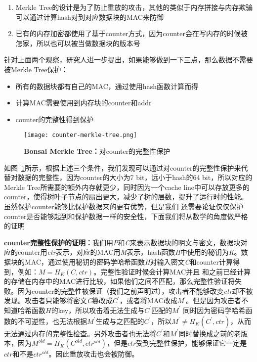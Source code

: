 \begin{enumerate}
    \item Merkle Tree的设计是为了防止重放的攻击，其他的类似于内存拼接与内存欺骗可以通过计算hash对到对应数据块的MAC来防御
    \item 已有的内存加密都使用了基于counter方式，因为counter会在写内存的时候被怎家，所以也可以被当做数据块的版本号
\end{enumerate}
针对上面两个观察，研究人进一步提出，如果能够做到一下三点，那么数据不需要被Merkle Tree保护：
\begin{itemize}
    \item 所有的数据块都有自己的MAC，通过使用hash函数计算而得
    \item 计算MAC需要使用到内存块的counter和addr
    \item counter的完整性得到保护
\end{itemize}
\begin{figure}[!htp]
    \centering
    \texttt{[image: counter-merkle-tree.png]}
    \caption{\textbf{Bonsai Merkle Tree：}对counter的完整性保护 }
   \label{fig:counter-merkle-tree.png}
\end{figure}
如图~\ref{fig:counter-merkle-tree.png}所示，根据上述三个条件，我们发现可以通过对counter的完整性保护来代替对数据的完整性，因为counter的大小为7 bit，远小于hash的64 bit，所以对应的Merkle Tree所需要的额外内存就更少，同时因为一个cache line中可以存放更多的counter，使得树叶子节点的扇出更大，减少了树的层数，提升了运行时的性能。虽然保护counter能够比保护数据来的更有优势，但是我们
还需要论证仅仅保护counter是否能够起到和保护数据一样的安全性，下面我们将从数学的角度做严格的证明

\textbf{counter完整性保护的证明：}我们用\emph{P}和\emph{C}来表示数据块的明文与密文，数据块对应的counter用\emph{ctr}表示，对应的MAC用\emph{M}表示，hash函数\emph{H}中使用的秘钥为\emph{K}。数据块的MAC，通过使用秘钥的密码学哈希函数\emph{H}对输入密文\emph{C}和counter计算得到，例如：$M = H_K(C, ctr)$。完整性验证时候会计算MAC并且
和之前已经计算的存储在内存中的MAC进行比较，如果他们之间不匹配，那么完整性验证将失败。因为counter的完整性被保证（我们之前声明过），攻击者不能够改变\emph{ctr}却不被发现。攻击者只能够将密文\emph{C}篡改成$C^{\prime}$，或者将MAC改成$M^{\prime}$。但是因为攻击者不知道哈希函数$H$的key，所以攻击着无法生成与$C^{\prime}$匹配的$M^{\prime}$
同时因为密码学哈希函数的不可逆性，也无法根据$M^{\prime}$生成与之匹配的$C^{\prime}$，所以$M^{\prime} \neq H_K(C^{\prime}, ctr)$，从而无法通过内存的完整性检查。另外攻击者也无法将$C^{\prime}$和$M^{\prime}$同时替换成之前的老版本，因为$M^{old} = H_K(C^{old}, ctr^{old})$，但是$ctr$受到完整性保护，能够保证它一定是$ctr$和不是$ctr^{old}$。因此重放攻击也会被防御。

